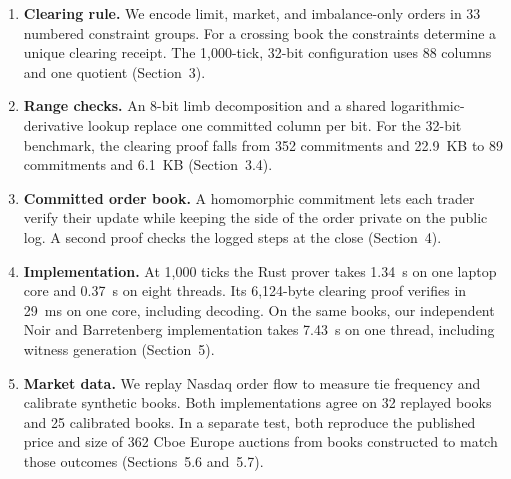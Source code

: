 \begin{enumerate}
    \item \textbf{Clearing rule.} We encode limit, market, and
        imbalance-only orders in 33 numbered constraint groups. For a
        crossing book the constraints determine a unique clearing receipt.
        The 1,000-tick, 32-bit configuration uses 88 columns and one quotient
        (Section~3).

    \item \textbf{Range checks.} An 8-bit limb decomposition and a shared
        logarithmic-derivative lookup replace one committed column per bit.
        For the 32-bit benchmark, the clearing proof falls from 352
        commitments and 22.9~KB to 89 commitments and 6.1~KB
        (Section~3.4).

    \item \textbf{Committed order book.} A homomorphic commitment lets each
        trader verify their update while keeping the side of the order
        private on the public log. A second proof checks the logged steps at
        the close (Section~4).

    \item \textbf{Implementation.} At 1,000 ticks the Rust prover takes
        1.34~s on one laptop core and 0.37~s on eight threads. Its 6,124-byte
        clearing proof verifies in 29~ms on one core, including decoding. On
        the same books, our independent Noir and Barretenberg implementation
        takes 7.43~s on one thread, including witness generation
        (Section~5).

    \item \textbf{Market data.} We replay Nasdaq order flow to measure tie
        frequency and calibrate synthetic books. Both implementations agree
        on 32 replayed books and 25 calibrated books. In a separate test,
        both reproduce the published price and size of 362 Cboe Europe
        auctions from books constructed to match those outcomes
        (Sections~5.6 and~5.7).
\end{enumerate}
